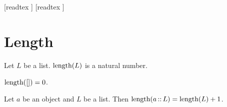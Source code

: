 \documentclass[10pt]{article}
\begin{document}
  \begin{imports}
    \begin{forthel}
      [readtex ]
      [readtex ]
    \end{forthel}
  \end{imports}


  \section*{Length}

  \begin{forthel}
    \begin{signature}
      Let $L$ be a list.
      $\textrm{length}(L)$ is a natural number.
    \end{signature}
  \end{forthel}

  \begin{forthel}
    \begin{axiom}
      $\textrm{length}([]) = 0$.
    \end{axiom}
  \end{forthel}

  \begin{forthel}
    \begin{axiom}
      Let $a$ be an object and $L$ be a list.
      Then $\textrm{length}(a \mathop{::} L) = \textrm{length}(L) + 1$.
    \end{axiom}
  \end{forthel}
\end{document}
